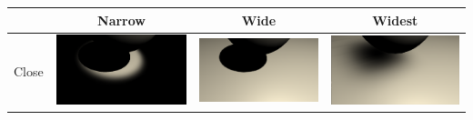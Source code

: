 \begin{table}
  \centering
  \begin{tabular}{| c | c | c | c | }
    \hline
    & Narrow & Wide & Widest \\ \hline
    Close&  \begin{minipage}{.3\textwidth}
            \includegraphics[width=\linewidth]{figures/shadows/spot-cleaned}
            \end{minipage}
            &
            \begin{minipage}{.3\textwidth}
            \includegraphics[width=\linewidth]{figures/shadows/spot-wide-cleaned}
            \end{minipage}
            & 
            \begin{minipage}{.3\textwidth}
            \includegraphics[width=\linewidth]{figures/shadows/spot-widest-cleaned}

\end{minipage}
\end{tabular}
\end{table}
